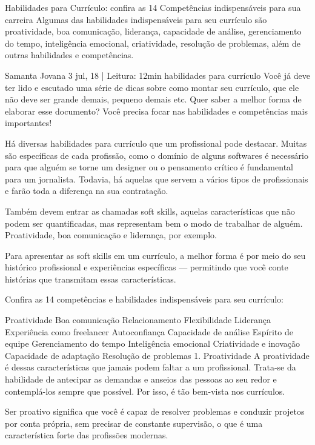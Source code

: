 \begin{commentA} \vspace{0.3cm} \noindent 
Habilidades para Currículo: confira as 14 Competências indispensáveis para sua carreira
Algumas das habilidades indispensáveis para seu currículo são proatividade, boa comunicação, liderança, capacidade de análise, gerenciamento do tempo, inteligência emocional, criatividade, resolução de problemas, além de outras habilidades e competências.

Samanta Jovana
3 jul, 18 | Leitura: 12min
habilidades para currículo
Você já deve ter lido e escutado uma série de dicas sobre como montar seu currículo, que ele não deve ser grande demais, pequeno demais etc. Quer saber a melhor forma de elaborar esse documento? Você precisa focar nas habilidades e competências mais importantes!

Há diversas habilidades para currículo que um profissional pode destacar. Muitas são específicas de cada profissão, como o domínio de alguns softwares é necessário para que alguém se torne um designer ou o pensamento crítico é fundamental para um jornalista. Todavia, há aquelas que servem a vários tipos de profissionais e farão toda a diferença na sua contratação.

Também devem entrar as chamadas soft skills, aquelas características que não podem ser quantificadas, mas representam bem o modo de trabalhar de alguém. Proatividade, boa comunicação e liderança, por exemplo.

Para apresentar as soft skills em um currículo, a melhor forma é por meio do seu histórico profissional e experiências específicas — permitindo que você conte histórias que transmitam essas características.

Confira as 14 competências e habilidades indispensáveis para seu currículo:

Proatividade
Boa comunicação
Relacionamento
Flexibilidade
Liderança
Experiência como freelancer
Autoconfiança
Capacidade de análise
Espírito de equipe
Gerenciamento do tempo
Inteligência emocional
Criatividade e inovação
Capacidade de adaptação
Resolução de problemas
1. Proatividade
A proatividade é dessas características que jamais podem faltar a um profissional. Trata-se da habilidade de antecipar as demandas e anseios das pessoas ao seu redor e contemplá-los sempre que possível. Por isso, é tão bem-vista nos currículos.

Ser proativo significa que você é capaz de resolver problemas e conduzir projetos por conta própria, sem precisar de constante supervisão, o que é uma característica forte das profissões modernas.


\end{commentA}
